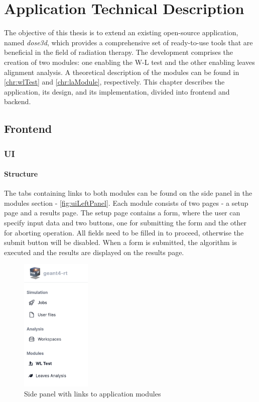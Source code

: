 \chapter{Application Technical Description} \label{chr:appTechDescription}

The objective of this thesis is to extend an existing open-source application, named \emph{dose3d}, which provides a comprehensive set of ready-to-use tools that are beneficial in the field of radiation therapy. The development comprises the creation of two modules: one enabling the W-L test and the other enabling leaves alignment analysis. A theoretical description of the modules can be found in \autoref{chr:wlTest} and \autoref{chr:laModule}, respectively. This chapter describes the application, its design, and its implementation, divided into frontend and backend.

\section{Frontend}

\subsection{UI}

\subsubsection{Structure}

The tabs containing links to both modules can be found on the side panel in the modules section - \autoref{fig:uiLeftPanel}. Each module consists of two pages - a setup page and a results page. The setup page contains a form, where the user can specify input data and two buttons, one for submitting the form and the other for aborting operation. All fields need to be filled in to proceed, otherwise the submit button will be disabled. When a form is submitted, the algorithm is executed and the results are displayed on the results page.

\begin{figure}
    \centering
    \includegraphics[width=0.30\textwidth]{Content/Images/ui_left_panel.png}
    \caption{Side panel with links to application modules}
    \label{fig:uiLeftPanel}
\end{figure}


